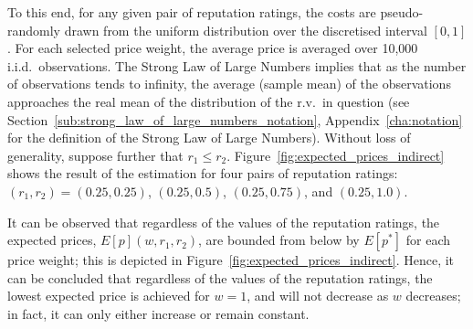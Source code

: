 To this end, for any given pair of reputation ratings, the costs are pseudo-randomly drawn from the uniform distribution over the discretised interval $[0,1]$. For each selected price weight, the average price is averaged over 10,000 i.i.d.~observations. The Strong Law of Large Numbers implies that as the number of observations tends to infinity, the average (sample mean) of the observations approaches the real mean of the distribution of the r.v.~in question (see Section~\ref{sub:strong_law_of_large_numbers_notation}, Appendix~\ref{cha:notation} for the definition of the Strong Law of Large Numbers).  Without loss of generality, suppose further that $r_1 \le r_2$. Figure~\ref{fig:expected_prices_indirect} shows the result of the estimation for four pairs of reputation ratings: $(r_1, r_2) = (0.25, 0.25)$, $(0.25, 0.5)$, $(0.25, 0.75)$, and $(0.25, 1.0)$.

It can be observed that regardless of the values of the reputation ratings, the expected prices, $E[p](w,r_1,r_2)$, are bounded from below by $E[p^*]$ for each price weight; this is depicted in Figure~\ref{fig:expected_prices_indirect}. Hence, it can be concluded that regardless of the values of the reputation ratings, the lowest expected price is achieved for $w=1$, and will not decrease as $w$ decreases; in fact, it can only either increase or remain constant.

